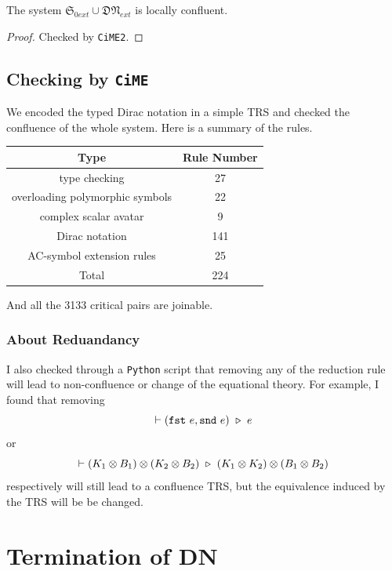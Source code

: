 
\begin{proposition}
  The system $\mathfrak{S}_{0ext} \cup \mathfrak{DN}_{ext}$ is locally confluent.
\end{proposition}
\begin{proof}
  Checked by \texttt{CiME2}.
\end{proof}

\subsection{Checking by \texttt{CiME}}

We encoded the typed Dirac notation in a simple TRS and checked the confluence of the whole system. Here is a summary of the rules.


\begin{center}
  \begin{tabular}{c|c}
  \hline
  Type & Rule Number \\
  \hline
  type checking & 27 \\
  overloading polymorphic symbols & 22 \\
  complex scalar avatar & 9 \\
  Dirac notation & 141 \\
  AC-symbol extension rules & 25 \\
  \hline
  Total & 224 \\
  \hline
  \end{tabular}
\end{center}

And all the 3133 critical pairs are joinable.

\subsubsection*{About Reduandancy}
I also checked through a \texttt{Python} script that removing any of the reduction rule will lead to non-confluence or change of the equational theory. For example, I found that removing 
$$
\vdash (\texttt{fst}\ e, \texttt{snd}\ e)\ \triangleright\  e
$$
or
$$
\vdash (K_1 \otimes B_1) \otimes (K_2 \otimes B_2) \ \triangleright\  (K_1 \otimes K_2) \otimes (B_1 \otimes B_2)
$$
respectively will still lead to a confluence TRS, but the equivalence induced by the TRS will be be changed.


\section{Termination of DN}

